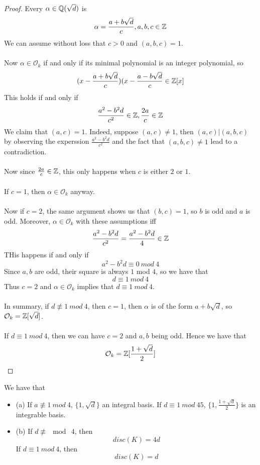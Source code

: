 \begin{proof}
Every $\alpha \in \mathbb{Q}(\sqrt{d})$ is 
\[\alpha = \frac{a + b \sqrt{d}}{c}, a, b, c \in \mathbb{Z}\]
We can assume without loss that $c > 0$ and $(a, b, c) = 1$.\\\\
Now $\alpha \in \mathcal{O}_k$ if and only if its minimal polynomial is an integer polynomial, so
\[(x - \frac{a + b \sqrt{d}}{c})(x - \frac{a - b \sqrt{d}}{c} \in \mathbb{Z}[x]\]
This holds if and only if
\[\frac{a^2 - b^2 d}{c^2} \in \mathbb{Z}, \frac{2a}{c} \in \mathbb{Z}\]
We claim that $(a, c) = 1$. Indeed, suppose $(a, c) \neq 1$, then $(a, c) | (a, b, c)$ by observing the experssion $\frac{a^2 - b^2 d}{c^2}$ and the fact that $(a, b, c) \neq 1$ lead to a contradiction.\\\\
Now since $\frac{2a}{c} \in \mathbb{Z}$, this only happens when $c$ is either $2$ or $1$.\\\\
If $c = 1$, then $\alpha \in \mathcal{O}_k$ anyway.\\\\
Now if $c = 2$, the same argument shows us that $(b, c) = 1$, so $b$ is odd and $a$ is odd. Moreover, $\alpha \in \mathcal{O}_k$ with these assumptions iff
\[\frac{a^2 - b^2d}{c^2} = \frac{a^2 - b^2 d}{4} \in \mathbb{Z}\]
THis happens if and only if
\[a^2 - b^2 d \equiv 0\ mod\ 4\]
Since $a, b$ are odd, their square is always $1$ mod $4$, so we have that
\[d \equiv 1\ mod\ 4\]
Thus $c = 2$ and $\alpha \in \mathcal{O}_k$ implies that $d \equiv 1\ mod\ 4$.\\\\
In summary, if $d \not \equiv 1\ mod\ 4$, then $c = 1$, then $\alpha$ is of the form $a + b \sqrt{d}$, so $\mathcal{O}_k = \mathbb{Z}[\sqrt{d}]$.\\\\
If $d \equiv 1\ mod\ 4$, then we can have $c = 2$ and $a, b$ being odd. Hence we have that
\[\mathcal{O}_k = \mathbb{Z}[\frac{1 + \sqrt{d}}{2}]\]
\end{proof}

\begin{theorem}[pg. 65 of S+T]
We have that
\begin{itemize}
    \item (a) If $a \not \equiv 1\ mod\ 4$, $\{1, \sqrt{d}\}$ an integral basis. If $d \equiv 1\ mod\ 45$, $\{1, \frac{1 + \sqrt{d}}{2}\}$ is an integrable basis.
    \item (b) If $d \not \equiv \mod\ 4$, then
    \[disc(K) = 4d\]
    If $d \equiv 1\ mod\ 4$, then
    \[disc(K) = d\]
\end{itemize}
\end{theorem}

